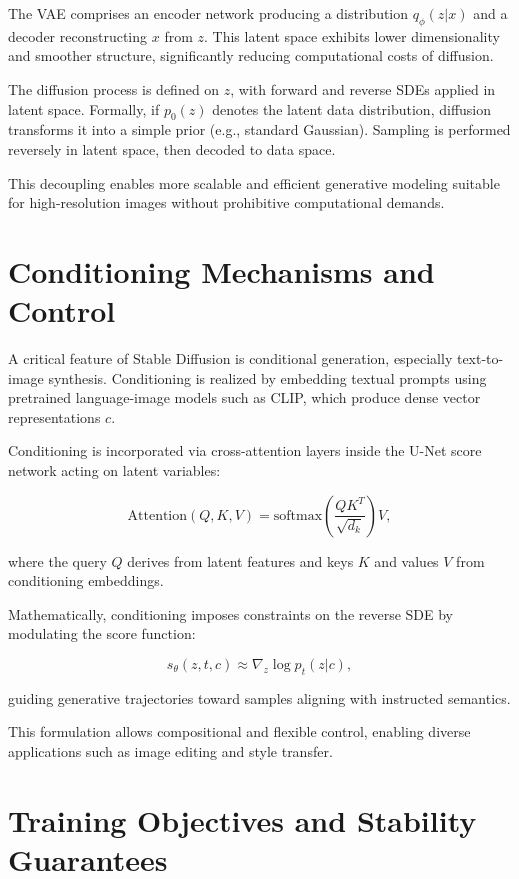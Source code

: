 The VAE comprises an encoder network producing a distribution \( q_\phi(z|x) \) and a decoder reconstructing \( x \) from \( z \). This latent space exhibits lower dimensionality and smoother structure, significantly reducing computational costs of diffusion.

The diffusion process is defined on \( z \), with forward and reverse SDEs applied in latent space. Formally, if \( p_0(z) \) denotes the latent data distribution, diffusion transforms it into a simple prior (e.g., standard Gaussian). Sampling is performed reversely in latent space, then decoded to data space.

This decoupling enables more scalable and efficient generative modeling suitable for high-resolution images without prohibitive computational demands.

\section{Conditioning Mechanisms and Control}

A critical feature of Stable Diffusion is conditional generation, especially text-to-image synthesis. Conditioning is realized by embedding textual prompts using pretrained language-image models such as CLIP, which produce dense vector representations \( c \).

Conditioning is incorporated via cross-attention layers inside the U-Net score network acting on latent variables:

\[
\text{Attention}(Q,K,V) = \text{softmax}\left(\frac{QK^T}{\sqrt{d_k}}\right) V,
\]

where the query \( Q \) derives from latent features and keys \( K \) and values \( V \) from conditioning embeddings.

Mathematically, conditioning imposes constraints on the reverse SDE by modulating the score function:

\[
s_\theta(z,t,c) \approx \nabla_z \log p_t(z | c),
\]

guiding generative trajectories toward samples aligning with instructed semantics.

This formulation allows compositional and flexible control, enabling diverse applications such as image editing and style transfer.

\section{Training Objectives and Stability Guarantees}


